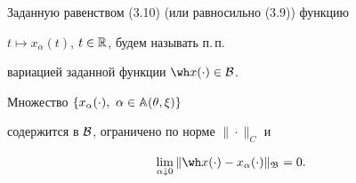 Заданную равенством (3.10) (или равносильно (3.9)) функцию


$t\mapsto x_{\alpha}(t)$, $t\in\Bbb R$, будем называть п.\,п.


вариацией заданной функции $\wh x(\cdot)\in\cal B$.





\begin{lems}


Множество $\{x_{\alpha}(\cdot),\ \alpha\in\Bbb A(\theta,\xi)\}$


содержится в $\cal B$, ограничено по норме $\|\cdot\|_{C}$ и


\begin{equation}


\lim\limits_{\alpha\downarrow 0}\|\wh x(\cdot)-


x_{\alpha}(\cdot)\|_{\frak B}=0.


\end{equation}


\end{lems}





